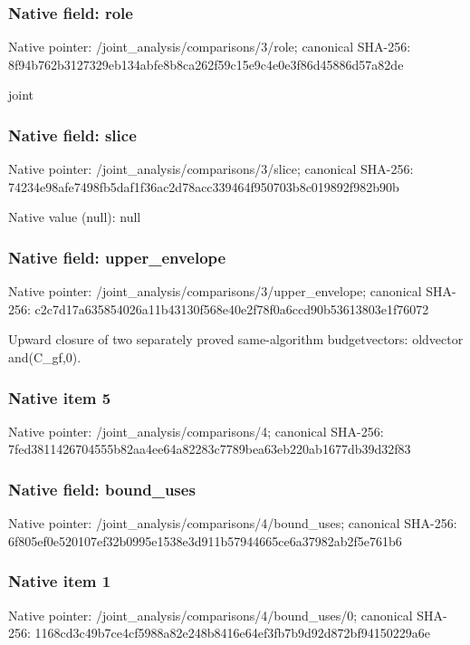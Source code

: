 \documentclass[10pt,a4paper]{article}
\begin{document}
\subsubsection{Native field: role}
Native pointer: /joint\_\allowbreak{}analysis/comparisons/3/role; canonical SHA-256: 8f94b762b3127329eb134abfe8b8ca262f59c15e9c4e0e3f86d45886d57a82de

\begingroup\raggedright\sloppy joint\par\endgroup

\subsubsection{Native field: slice}
Native pointer: /joint\_\allowbreak{}analysis/comparisons/3/slice; canonical SHA-256: 74234e98afe7498fb5daf1f36ac2d78acc339464f950703b8c019892f982b90b

Native value (null): null

\subsubsection{Native field: upper\_\allowbreak{}envelope}
Native pointer: /joint\_\allowbreak{}analysis/comparisons/3/upper\_\allowbreak{}envelope; canonical SHA-256: c2c7d17a635854026a11b43130f568e40e2f78f0a6ccd90b53613803e1f76072

\begingroup\raggedright\sloppy Upward closure of two separately proved same-algorithm budgetvectors:\allowbreak{} oldvector and(C\_\allowbreak{}gf,\allowbreak{}0).\par\endgroup

\subsubsection{Native item 5}
Native pointer: /joint\_\allowbreak{}analysis/comparisons/4; canonical SHA-256: 7fed3811426704555b82aa4ee64a82283c7789bea63eb220ab1677db39d32f83

\subsubsection{Native field: bound\_\allowbreak{}uses}
Native pointer: /joint\_\allowbreak{}analysis/comparisons/4/bound\_\allowbreak{}uses; canonical SHA-256: 6f805ef0e520107ef32b0995e1538e3d911b57944665ce6a37982ab2f5e761b6

\subsubsection{Native item 1}
Native pointer: /joint\_\allowbreak{}analysis/comparisons/4/bound\_\allowbreak{}uses/0; canonical SHA-256: 1168cd3c49b7ce4cf5988a82e248b8416e64ef3fb7b9d92d872bf94150229a6e
\end{document}
